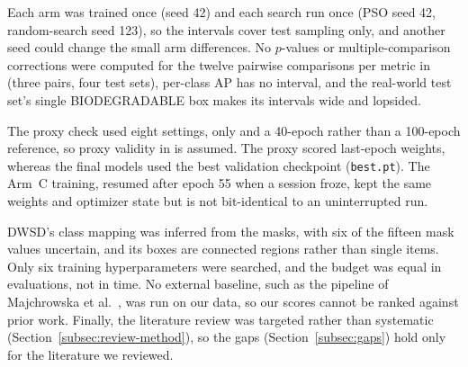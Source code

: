 Each arm was trained once (seed 42) and each search run once (PSO seed 42, random-search seed 123), so the intervals cover test sampling only, and another seed could change the small arm differences. No $p$-values or multiple-comparison corrections were computed for the twelve pairwise comparisons per metric in \gentwo (three pairs, four test sets), per-class AP has no interval, and the real-world test set's single BIODEGRADABLE box makes its intervals wide and lopsided.

The proxy check used eight settings, \genone only and a 40-epoch rather than a 100-epoch reference, so proxy validity in \gentwo is assumed. The proxy scored last-epoch weights, whereas the final models used the best validation checkpoint (\texttt{best.pt}). The \gentwo Arm~C training, resumed after epoch 55 when a session froze, kept the same weights and optimizer state but is not bit-identical to an uninterrupted run.

DWSD's class mapping was inferred from the masks, with six of the fifteen mask values uncertain, and its boxes are connected regions rather than single items. Only six training hyperparameters were searched, and the budget was equal in evaluations, not in time. No external baseline, such as the pipeline of Majchrowska et al.~\cite{majchrowska2022deep}, was run on our data, so our scores cannot be ranked against prior work. Finally, the literature review was targeted rather than systematic (Section~\ref{subsec:review-method}), so the gaps (Section~\ref{subsec:gaps}) hold only for the literature we reviewed.
